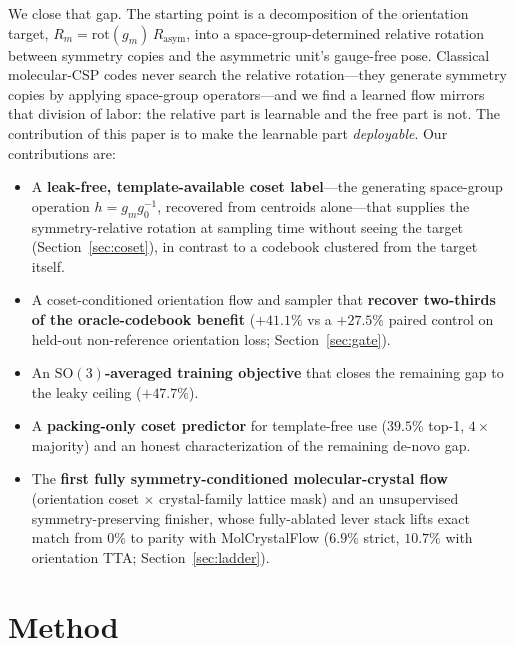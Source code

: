 \documentclass{article}
\begin{document}
We close that gap. The starting point is a decomposition of the orientation
target, $R_m=\mathrm{rot}(g_m)\,R_{\text{asym}}$, into a space-group-determined
relative rotation between symmetry copies and the asymmetric unit's gauge-free
pose. Classical molecular-CSP codes never search the relative rotation---they
generate symmetry copies by applying space-group
operators\cite{price2023blindtest7,obrien2021dataefficient}---and we find a
learned flow mirrors that division of labor: the relative part is learnable and
the free part is not. The contribution of this paper is to make the learnable
part \emph{deployable}. Our contributions are:
\begin{itemize}\itemsep0.05em
\item A \textbf{leak-free, template-available coset label}---the generating
space-group operation $h=g_m g_0^{-1}$, recovered from centroids alone---that
supplies the symmetry-relative rotation at sampling time without seeing the
target (Section~\ref{sec:coset}), in contrast to a codebook clustered from the
target itself.
\item A coset-conditioned orientation flow and sampler that \textbf{recover
two-thirds of the oracle-codebook benefit} ($+41.1\%$ vs a $+27.5\%$ paired
control on held-out non-reference orientation loss; Section~\ref{sec:gate}).
\item An \textbf{$\mathrm{SO}(3)$-averaged training objective}\cite{cao2025so3averaged}
that closes the remaining gap to the leaky ceiling ($+47.7\%$).
\item A \textbf{packing-only coset predictor} for template-free use ($39.5\%$
top-1, $4\times$ majority) and an honest characterization of the remaining
de-novo gap.
\item The \textbf{first fully symmetry-conditioned molecular-crystal flow}
(orientation coset $\times$ crystal-family lattice mask) and an unsupervised
symmetry-preserving finisher, whose fully-ablated lever stack lifts exact match
from $0\%$ to parity with MolCrystalFlow ($6.9\%$ strict, $10.7\%$ with
orientation TTA; Section~\ref{sec:ladder}).
\end{itemize}

\section{Method}
\end{document}
